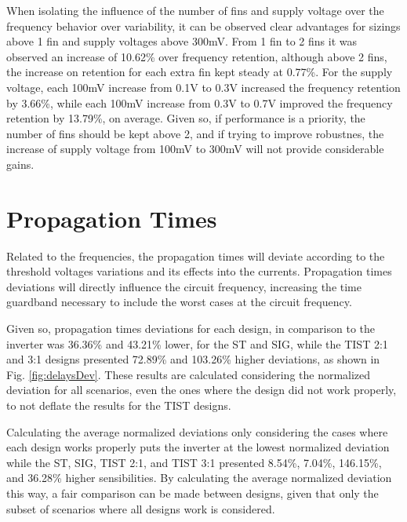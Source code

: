 \documentclass[diss,pgmicro,english]{iiufrgs}
\begin{document}
When isolating the influence of the number of fins and supply voltage over the frequency behavior over variability, it can be observed clear advantages for sizings above 1 fin and supply voltages above 300mV. From 1 fin to 2 fins it was observed an increase of 10.62\% over frequency retention, although above 2 fins, the increase on retention for each extra fin kept steady at 0.77\%. For the supply voltage, each 100mV increase from 0.1V to 0.3V increased the frequency retention by 3.66\%, while each 100mV increase from 0.3V to 0.7V improved the frequency retention by 13.79\%, on average. Given so, if performance is a priority, the number of fins should be kept above 2, and if trying to improve robustnes, the increase of supply voltage from 100mV to 300mV will not provide considerable gains.


\section{Propagation Times}

\vspace{-0.5cm}

Related to the frequencies, the propagation times will deviate according to the threshold voltages variations and its effects into the currents. Propagation times deviations will directly influence the circuit frequency, increasing the time guardband necessary to include the worst cases at the circuit frequency.

Given so, propagation times deviations for each design, in comparison to the inverter was 36.36\% and 43.21\% lower, for the ST and SIG, while the TIST 2:1 and 3:1 designs presented 72.89\% and 103.26\% higher deviations, as shown in Fig. \ref{fig:delaysDev}. These results are calculated considering the normalized deviation for all scenarios, even the ones where the design did not work properly, to not deflate the results for the TIST designs.

Calculating the average normalized deviations only considering the cases where each design works properly puts the inverter at the lowest normalized deviation while the ST, SIG, TIST 2:1, and TIST 3:1 presented 8.54\%, 7.04\%, 146.15\%, and 36.28\% higher sensibilities. By calculating the average normalized deviation this way, a fair comparison can be made between designs, given that only the subset of scenarios where all designs work is considered.
\end{document}
